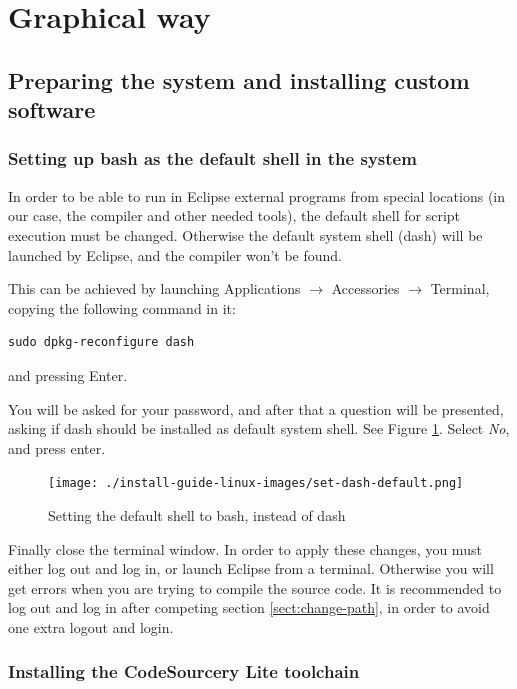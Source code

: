 \documentclass[a4paper, 10pt]{article}
\begin{document}
\section{Graphical way}

\subsection{Preparing the system and installing custom software}


\subsubsection{Setting up bash as the default shell in the system}

In order to be able to run in Eclipse external programs from special locations
(in our case, the compiler and other needed tools),
the default shell for script execution must be changed.
Otherwise the default system shell (dash) will be launched by Eclipse,
and the compiler won't be found.

This can be achieved by launching Applications $\rightarrow$ Accessories $\rightarrow$ Terminal,
copying the following command in it:

\begin{verbatim}
sudo dpkg-reconfigure dash
\end{verbatim}

and pressing Enter.

You will be asked for your password,
and after that a question will be presented, asking
if dash should be installed as default system shell.
See Figure \ref{fig:set-dash-default}.
Select \emph{No}, and press enter.

    \begin{figure}[H]
    \centering
        \texttt{[image: ./install-guide-linux-images/set-dash-default.png]}
        \caption{Setting the default shell to bash, instead of dash}
        \label{fig:set-dash-default}
    \end{figure}

Finally close the terminal window.
In order to apply these changes, you must either log out and log in,
or launch Eclipse from a terminal.
Otherwise you will get errors when you are trying to compile the source code.
It is recommended to log out and log in after
competing section \ref{sect:change-path}, in order to avoid one extra logout and login.

\subsubsection{Installing the CodeSourcery Lite toolchain}
\end{document}
